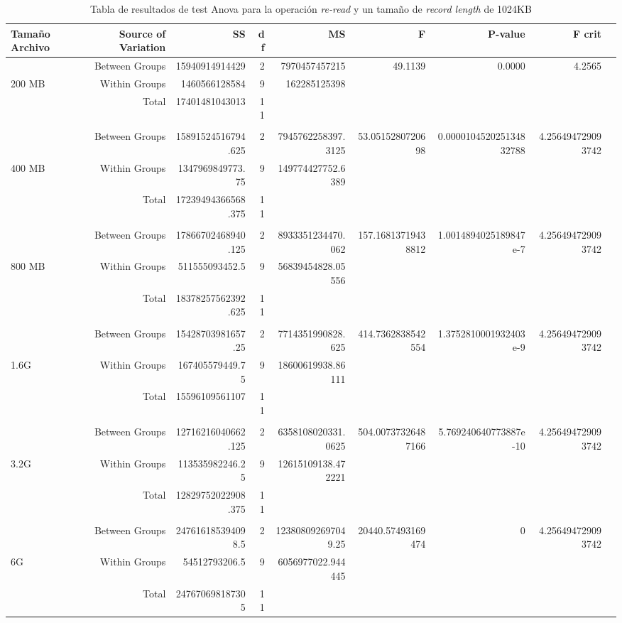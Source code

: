 \begin{landscape}
\begin{table}[!htp]\centering
\caption{Tabla de resultados de test Anova para la operación \textit{re-read} y un tamaño de \textit{record length} de 1024KB}\label{tab: }

\scriptsize
\begin{tabular}{lrrrrrrrr}\toprule
Tamaño Archivo &Source of Variation &SS &df &MS &F &P-value &F crit \\\midrule
&Between Groups &15940914914429 &2 &7970457457215 &49.1139 &0.0000 &4.2565 \\
200 MB &Within Groups &1460566128584 &9 &162285125398 & & & \\
&Total &17401481043013 &11 & & & & \\
& & & & & & & \\
&Between Groups &15891524516794.625 &2 &7945762258397.3125 &53.0515280720698 &0.000010452025134832788 &4.256494729093742 \\
400 MB &Within Groups &1347969849773.75 &9 &149774427752.6389 & & & \\
&Total &17239494366568.375 &11 & & & & \\
& & & & & & & \\
&Between Groups &17866702468940.125 &2 &8933351234470.062 &157.16813719438812 &1.0014894025189847e-7 &4.256494729093742 \\
800 MB &Within Groups &511555093452.5 &9 &56839454828.05556 & & & \\
&Total &18378257562392.625 &11 & & & & \\
& & & & & & & \\
&Between Groups &15428703981657.25 &2 &7714351990828.625 &414.7362838542554 &1.3752810001932403e-9 &4.256494729093742 \\
1.6G &Within Groups &167405579449.75 &9 &18600619938.86111 & & & \\
&Total &15596109561107 &11 & & & & \\
& & & & & & & \\
&Between Groups &12716216040662.125 &2 &6358108020331.0625 &504.00737326487166 &5.769240640773887e-10 &4.256494729093742 \\
3.2G &Within Groups &113535982246.25 &9 &12615109138.472221 & & & \\
&Total &12829752022908.375 &11 & & & & \\
& & & & & & & \\
&Between Groups &247616185394098.5 &2 &123808092697049.25 &20440.57493169474 &0 &4.256494729093742 \\
6G &Within Groups &54512793206.5 &9 &6056977022.944445 & & & \\
&Total &247670698187305 &11 & & & & \\
\bottomrule
\end{tabular}
\end{table}
\end{landscape}

